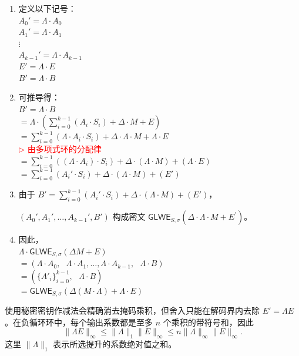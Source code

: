 \begin{myproof}
\begin{enumerate}
\item 定义以下记号： \\
$A_0' = \Lambda \cdot A_0$ \\
$A_1' = \Lambda \cdot A_1$ \\
$\vdots$ \\
$A_{k-1}' = \Lambda \cdot A_{k-1}$ \\
$E' = \Lambda \cdot E$ \\
$B' = \Lambda \cdot B$ \\
\item 可推导得： \\
$B' = \Lambda \cdot B$ \\
$= \Lambda \cdot (\sum\limits_{i=0}^{k-1}{(A_i \cdot S_i)} + \Delta \cdot M + E)$ 
$= \sum\limits_{i=0}^{k-1}{(\Lambda \cdot A_i \cdot S_i)} + \Delta \cdot \Lambda \cdot M + \Lambda \cdot E$ \\ \textcolor{red}{ $\rhd$ 由多项式环的分配律} \\
$= \sum\limits_{i=0}^{k-1}{((\Lambda \cdot A_i) \cdot S_i)} + \Delta \cdot (\Lambda \cdot M) + (\Lambda \cdot E)$  \\
$= \sum\limits_{i=0}^{k-1}{(A_i' \cdot S_i)} + \Delta \cdot (\Lambda \cdot M) + (E')$ \\
\item 由于 $B' = \sum\limits_{i=0}^{k-1}{(A_i' \cdot S_i)} + \Delta \cdot (\Lambda \cdot M) + (E')$，

$(A_0', A_1', \ldots, A_{k-1}'
, B')$ 构成密文 $\textsf{GLWE}_{S, \sigma}(\Delta \cdot \Lambda \cdot M+E^{\prime})$。
\item 因此， \\
$\Lambda \cdot \textsf{GLWE}_{S, \sigma}(\Delta M + E)$ \\
$ = (\Lambda \cdot A_0, \text { } \Lambda \cdot A_1, \ldots, \Lambda \cdot A_{k-1}, \text { } \Lambda \cdot B)$ \\
$ = ( \{A'_{i}\}_{i=0}^{k-1}, \text { } \Lambda \cdot B)$ \\
$= \textsf{GLWE}_{S, \sigma}(\Delta (M \cdot \Lambda) + \Lambda \cdot E)$

\end{enumerate}
\end{myproof}

使用秘密密钥作减法会精确消去掩码乘积，但舍入只能在解码界内去除 $E'=\Lambda E$。在负循环环中，每个输出系数都是至多 $n$ 个乘积的带符号和，因此
\[
\|\Lambda E\|_\infty\le\|\Lambda\|_1\|E\|_\infty\le n\|\Lambda\|_\infty\|E\|_\infty.
\]
这里 $\|\Lambda\|_1$ 表示所选提升的系数绝对值之和。


